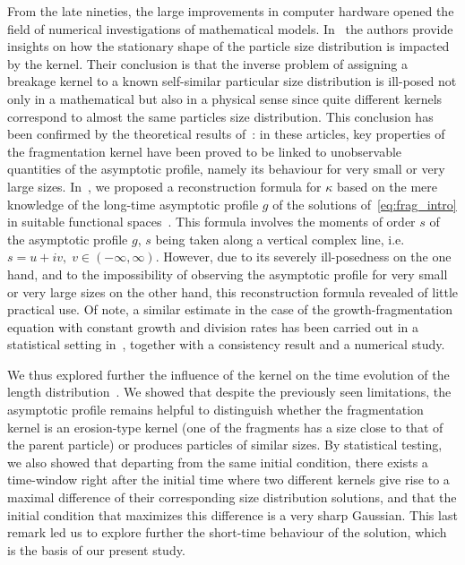 \documentclass[10pt]{amsart}
\theoremstyle{definition}\newtheorem{defi}[theo]{Definition}\newtheorem{rema}[theo]{Remark}\newtheorem{exam}[theo]{Example}\newtheorem{exem}[theo]{Example}\newtheorem{nota}[theo]{Notation}
\begin{document}
From the late nineties, the large improvements in computer hardware opened the field of numerical investigations of mathematical models. In~\cite{KK05} the authors provide insights on how the stationary shape of the particle size distribution is impacted by the kernel. Their conclusion is that the inverse problem of assigning a breakage kernel to a known self-similar particular size distribution is ill-posed not only in a mathematical but also in a physical sense since quite different kernels correspond to almost the same particles size distribution. This conclusion has been confirmed by the theoretical results of~\cite{BCG13,DET18}: in these articles, key properties of the fragmentation kernel have been proved to be linked to unobservable quantities of the asymptotic profile, namely its behaviour for very small or very large sizes. In~\cite{DET18}, we proposed a reconstruction formula for $\kappa$ based on the mere knowledge of the long-time asymptotic profile $g$ of the solutions of~\eqref{eq:frag_intro} in suitable functional spaces~\cite{DET18}. This formula involves the moments of order $s$ of the asymptotic profile $g$, $s$ being taken along a vertical complex line, i.e. $s= u+i v, \; v\in (-\infty,\infty)$. However, due to its severely ill-posedness on the one hand, and to the impossibility of observing the asymptotic profile for very small or very large sizes on the other hand, this reconstruction formula revealed of little practical use. Of note, a similar estimate in the case of the growth-fragmentation equation with constant growth and division rates has been carried out in a statistical setting in~\cite{HNRT19}, together with a consistency result and a numerical study.

We thus explored further the influence of the kernel on the time evolution of the length distribution~\cite{DETX20}. We showed that despite the previously seen limitations, the asymptotic profile remains helpful to distinguish whether the fragmentation kernel is an erosion-type kernel (one of the fragments has a size close to that of the parent particle) or produces particles of similar sizes. By statistical testing, we also showed that departing from the same initial condition, there exists a time-window right after the initial time where two different kernels give rise to a maximal difference of their corresponding size distribution solutions, and that the initial condition that maximizes this difference is a very sharp Gaussian. This last remark led us to explore further the short-time behaviour of the solution, which is the basis of our present study.
\end{document}
